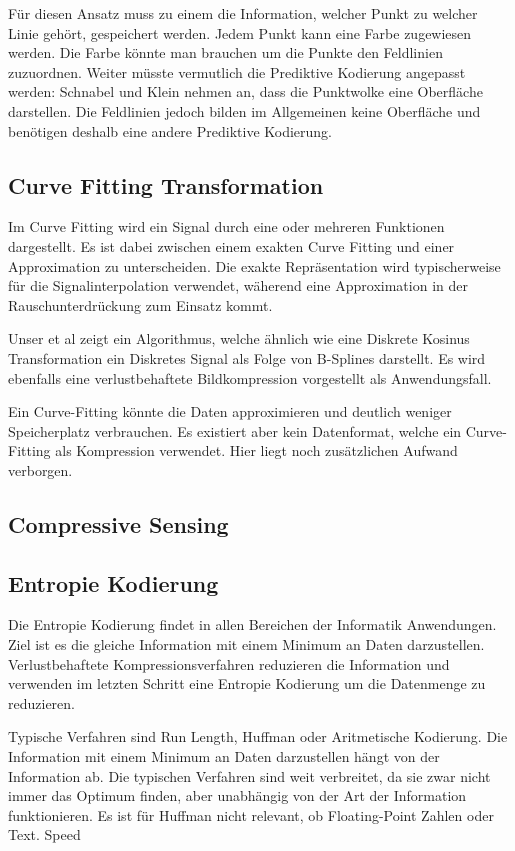 Für diesen Ansatz muss zu einem die Information, welcher Punkt zu welcher Linie gehört, gespeichert werden. Jedem Punkt kann eine Farbe zugewiesen werden. Die Farbe könnte man brauchen um die Punkte den Feldlinien zuzuordnen. Weiter müsste vermutlich die Prediktive Kodierung angepasst werden: Schnabel und Klein nehmen an, dass die Punktwolke eine Oberfläche darstellen. Die Feldlinien jedoch bilden im Allgemeinen keine Oberfläche und benötigen deshalb eine andere Prediktive Kodierung.

\subsection{Curve Fitting Transformation}
Im Curve Fitting wird ein Signal durch eine oder mehreren Funktionen dargestellt. Es ist dabei zwischen einem exakten Curve Fitting und einer Approximation zu unterscheiden. Die exakte Repräsentation wird typischerweise für die Signalinterpolation verwendet, wäherend eine Approximation in der Rauschunterdrückung zum Einsatz kommt.

Unser et al \cite{unser1993b:spline} zeigt ein Algorithmus, welche ähnlich wie eine Diskrete Kosinus Transformation ein Diskretes Signal als Folge von B-Splines darstellt. Es wird ebenfalls eine verlustbehaftete Bildkompression vorgestellt als Anwendungsfall.

Ein Curve-Fitting könnte die Daten approximieren und deutlich weniger Speicherplatz verbrauchen. Es existiert aber kein Datenformat, welche ein Curve-Fitting als Kompression verwendet. Hier liegt noch zusätzlichen Aufwand verborgen.

\subsection{Compressive Sensing}


\subsection{Entropie Kodierung}
Die Entropie Kodierung findet in allen Bereichen der Informatik Anwendungen. Ziel ist es die gleiche Information mit einem Minimum an Daten darzustellen. Verlustbehaftete Kompressionsverfahren reduzieren die Information und verwenden im letzten Schritt eine Entropie Kodierung um die Datenmenge zu reduzieren.

Typische Verfahren sind Run Length, Huffman oder Aritmetische Kodierung. Die Information mit einem Minimum an Daten darzustellen hängt von der Information ab. Die typischen Verfahren sind weit verbreitet, da sie zwar nicht immer das Optimum finden, aber unabhängig von der Art der Information funktionieren. Es ist für Huffman nicht relevant, ob Floating-Point Zahlen oder Text. 
Speed

